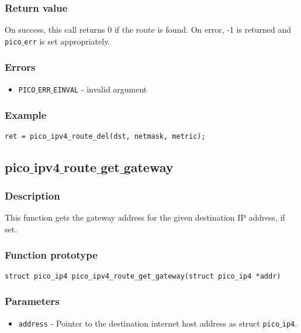 \subsubsection*{Return value}
On success, this call returns 0 if the route is found.
On error, -1 is returned and \texttt{pico$\_$err} is set appropriately.

\subsubsection*{Errors}
\begin{itemize}[noitemsep]
\item \texttt{PICO$\_$ERR$\_$EINVAL} - invalid argument
\end{itemize}

\subsubsection*{Example}
\begin{verbatim}
ret = pico_ipv4_route_del(dst, netmask, metric);
\end{verbatim}



\subsection{pico$\_$ipv4$\_$route$\_$get$\_$gateway}

\subsubsection*{Description}
This function gets the gateway address for the given destination IP address, if set.

\subsubsection*{Function prototype}
\begin{verbatim}
struct pico_ip4 pico_ipv4_route_get_gateway(struct pico_ip4 *addr)
\end{verbatim}

\subsubsection*{Parameters}
\begin{itemize}[noitemsep]
\item \texttt{address} - Pointer to the destination internet host address as struct \texttt{pico$\_$ip4}.
\end{itemize}

